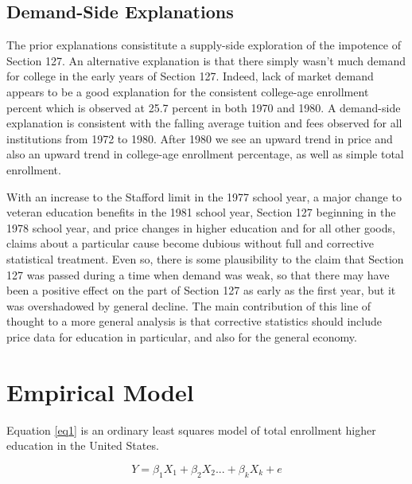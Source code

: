 \documentclass[review]{elsarticle}
\begin{document}
    \subsection{Demand-Side Explanations}
    The prior explanations consistitute a supply-side exploration of the impotence of Section 127.
    An alternative explanation is that there simply wasn't much demand for college in the early years of Section 127.
    Indeed, lack of market demand appears to be a good explanation for the consistent college-age enrollment percent
    which is observed at 25.7 percent in both 1970 and 1980.
    A demand-side explanation is consistent with the falling average tuition and fees observed for all institutions from 1972 to 1980.
    After 1980 we see an upward trend in price and also an upward trend in college-age enrollment percentage, as well as simple total enrollment.

    With an increase to the Stafford limit in the 1977 school year,
    a major change to veteran education benefits in the 1981 school year,
    Section 127 beginning in the 1978 school year,
    and price changes in higher education and for all other goods,
    claims about a particular cause become dubious without full and corrective statistical treatment.
    Even so,
    there is some plausibility to the claim that Section 127 was passed during a time when demand was weak,
    so that there may have been a positive effect on the part of Section 127 as early as the first year,
    but it was overshadowed by general decline.
    The main contribution of this line of thought to a more general analysis is that corrective statistics should include price data
    for education in particular, and also for the general economy.

    \section{Empirical Model}

    Equation \ref{eq1} is an ordinary least squares model of total enrollment higher education in the United States.

    \begin{equation}
        Y = \beta_1X_1+\beta_2X_2...+\beta_kX_k+e
        \label{eq1}
    \end{equation}
\end{document}
